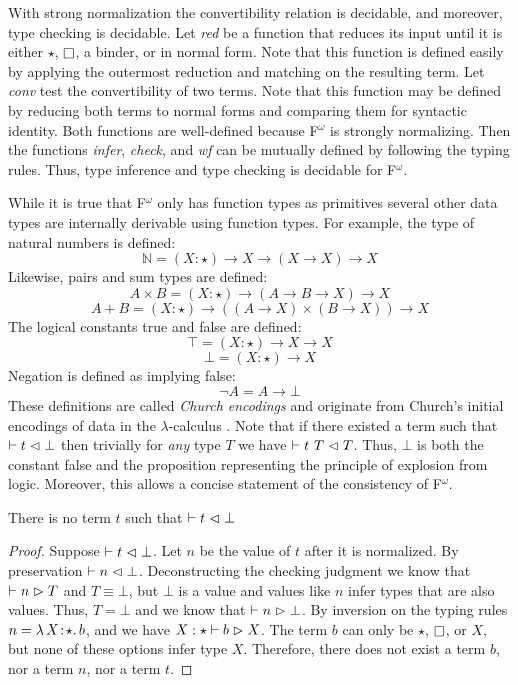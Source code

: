 With strong normalization the convertibility relation is decidable, and moreover, type checking is decidable.
Let \textit{red} be a function that reduces its input until it is either $\star$, $\kind$, a binder, or in normal form.
Note that this function is defined easily by applying the outermost reduction and matching on the resulting term.
Let \textit{conv} test the convertibility of two terms.
Note that this function may be defined by reducing both terms to normal forms and comparing them for syntactic identity.
Both functions are well-defined because F$^\omega$ is strongly normalizing.
Then the functions \textit{infer}, \textit{check}, and \textit{wf} can be mutually defined by following the typing rules.
Thus, type inference and type checking is decidable for F$^\omega$.

While it is true that F$^\omega$ only has function types as primitives several other data types are internally derivable using function types.
For example, the type of natural numbers is defined:
$$\mathbb{N} = (X : \star) \to X \to (X \to X) \to X$$
Likewise, pairs and sum types are defined:
$$A \times B = (X : \star) \to (A \to B \to X) \to X$$
$$A + B = (X : \star) \to ((A \to X) \times (B \to X)) \to X$$
The logical constants true and false are defined:
$$\top = (X : \star) \to X \to X$$
$$\bot = (X : \star) \to X$$
Negation is defined as implying false:
$$\neg A = A \to \bot$$
These definitions are called \textit{Church encodings} and originate from Church's initial encodings of data in the $\lambda$-calculus \cite{church1932,church1933}.
Note that if there existed a term such that $\vdash t \vartriangleleft \bot$ then trivially for \textit{any} type $T$ we have $\vdash t\ T \vartriangleleft T$.
Thus, $\bot$ is both the constant false and the proposition representing the principle of explosion from logic.
Moreover, this allows a concise statement of the consistency of F$^\omega$.

\begin{theorem}
    There is no term $t$ such that $\vdash t \vartriangleleft \bot$
\end{theorem}
\begin{proof}
    Suppose $\vdash t \vartriangleleft \bot$.
    Let $n$ be the value of $t$ after it is normalized.
    By preservation $\vdash n \vartriangleleft \bot$.
    Deconstructing the checking judgment we know that $\vdash n \vartriangleright T$ and $T \equiv \bot$, but $\bot$ is a value and values like $n$ infer types that are also values.
    Thus, $T = \bot$ and we know that $\vdash n \vartriangleright \bot$.
    By inversion on the typing rules $n = {\lambda}\, X\! : \! \star.\, b$, and we have $X : \star \vdash b \vartriangleright X$.
    The term $b$ can only be $\star$, $\kind$, or $X$, but none of these options infer type $X$.
    Therefore, there does not exist a term $b$, nor a term $n$, nor a term $t$.
\end{proof}

